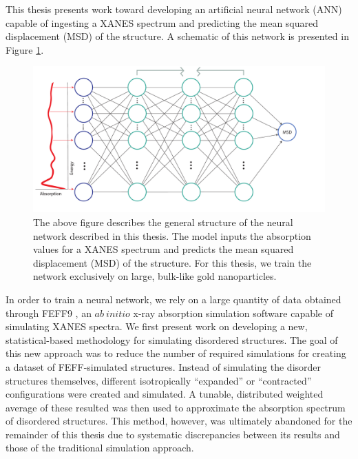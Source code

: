 

This thesis presents work toward developing an artificial neural network (ANN) capable of ingesting a XANES spectrum and predicting the mean squared displacement (MSD) of the structure. A schematic of this network is presented in Figure \ref{fig:thesis-design}. 

\begin{figure}[h!]
    \centering
    \includegraphics[width=\linewidth]{Chapters/Figures/thesis-design.pdf}
    \caption[Project Approach]{The above figure describes the general structure of the neural network described in this thesis. The model inputs the absorption values for a XANES spectrum and predicts the mean squared displacement (MSD) of the structure. For this thesis, we train the network exclusively on large, bulk-like gold nanoparticles.}
    \label{fig:thesis-design}
\end{figure}

In order to train a neural network, we rely on a large quantity of data obtained through FEFF9 \cite{feff-citation}, an $ ab~initio $ x-ray absorption simulation software capable of simulating XANES spectra. We first present work on developing a new, statistical-based methodology for simulating disordered structures. The goal of this new approach was to reduce the number of required simulations for creating a dataset of FEFF-simulated structures. Instead of simulating the disorder structures themselves, different isotropically ``expanded'' or ``contracted'' configurations were created and simulated. A tunable, distributed weighted average of these resulted was then used to approximate the absorption spectrum of disordered structures. This method, however, was ultimately abandoned for the remainder of this thesis due to systematic discrepancies between its results and those of the traditional simulation approach. 

